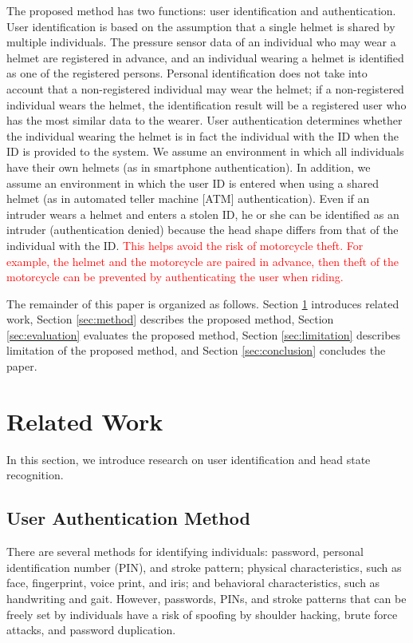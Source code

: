 \documentclass[english,preprint,JIP]{ipsj}
\begin{document}
The proposed method has two functions: user identification and authentication. User identification is based on the assumption that a single helmet is shared by multiple individuals. The pressure sensor data of an individual who may wear a helmet are registered in advance, and an individual wearing a helmet is identified as one of the registered persons. Personal identification does not take into account that a non-registered individual may wear the helmet; if a non-registered individual wears the helmet, the identification result will be a registered user who has the most similar data to the wearer. User authentication determines whether the individual wearing the helmet is in fact the individual with the ID when the ID is provided to the system. We assume an environment in which all individuals have their own helmets (as in smartphone authentication). In addition, we assume an environment in which the user ID is entered when using a shared helmet (as in automated teller machine [ATM] authentication). Even if an intruder wears a helmet and enters a stolen ID, he or she can be identified as an intruder (authentication denied) because the head shape differs from that of the individual with the ID. \textcolor{red}{This helps avoid the risk of motorcycle theft. For example, the helmet and the motorcycle are paired in advance, then theft of the motorcycle can be prevented by authenticating the user when riding.}\par

The remainder of this paper is organized as follows. Section \ref{sec:related} introduces related work, Section \ref{sec:method} describes the proposed method, Section \ref{sec:evaluation} evaluates the proposed method, Section \ref{sec:limitation} describes limitation of the proposed method, and Section \ref{sec:conclusion} concludes the paper.



\section{Related Work}
\label{sec:related}
In this section, we introduce research on user identification and head state recognition.


\subsection{User Authentication Method}
There are several methods for identifying individuals: password, personal identification number (PIN), and stroke pattern; physical characteristics, such as face, fingerprint, voice print, and iris; and behavioral characteristics, such as handwriting and gait. However, passwords, PINs, and stroke patterns that can be freely set by individuals have a risk of spoofing by shoulder hacking, brute force attacks, and password duplication.\par
\end{document}
